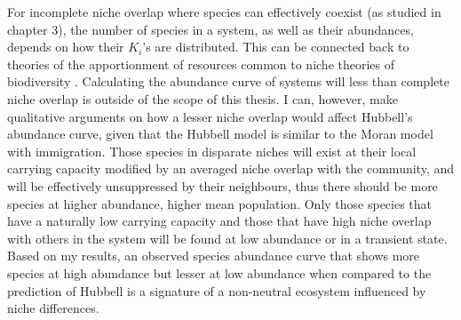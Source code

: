 For incomplete niche overlap where species can effectively coexist (as studied in chapter 3), the number of species in a system, as well as their abundances, depends on how their $K_i$'s are distributed. 
This can be connected back to theories of the apportionment of resources common to niche theories of biodiversity \cite{MacArthur1957,Sugihara2003,Leibold1995}. 
Calculating the abundance curve of systems will less than complete niche overlap is outside of the scope of this thesis. 
I can, however, make qualitative arguments on how a lesser niche overlap would affect Hubbell's abundance curve, given that the Hubbell model is similar to the Moran model with immigration. 
Those species in disparate niches will exist at their local carrying capacity modified by an averaged niche overlap with the community, and will be effectively unsuppressed by their neighbours, thus there should be more species at higher abundance, higher mean population. 
Only those species that have a naturally low carrying capacity and those that have high niche overlap with others in the system will be found at low abundance or in a transient state. 
Based on my results, an observed species abundance curve that shows more species at high abundance but lesser at low abundance when compared to the prediction of Hubbell is a signature of a non-neutral ecosystem influenced by niche differences. 
